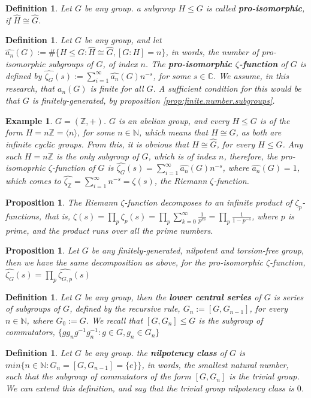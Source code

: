 \documentclass[12pt]{article}
\newtheorem{proposition}[theorem]{Proposition}
\newtheorem{definition}[theorem]{Definition}
\newtheorem{example}[theorem]{Example}
\begin{document}
\begin{definition}
\label{def:pro.isomorphic}
Let $G$ be any group. a subgroup $H\leq G$ is called \textbf{pro-isomorphic}, if $\widehat{H}\cong\widehat{G}$.
\end{definition}
\begin{definition}
\label{def:zeta.pro.isomorphic}
Let $G$ be any group, and let $\widehat{a_n}(G):=\#\{H\leq G : \widehat{H}\cong\widehat{G}, [G:H]=n\}$, in words, the number of pro-isomorphic subgroups of $G$, of index $n$. The \textbf{pro-isomorphic $\zeta$-function} of $G$ is defined by $\widehat{\zeta_G}(s):=\sum_{i=1}^{\infty}\widehat{a_n}(G)n^{-s}$, for some $s\in\mathbb{C}$. We assume, in this research, that $\widehat{a_n}(G)$ is finite for all $G$. A sufficient condition for this would be that $G$ is finitely-generated, by proposition \ref{prop:finite.number.subgroups}.
\end{definition}
\begin{example}
$G=(\mathbb{Z},+)$. $G$ is an abelian group, and every $H\leq G$ is of the form $H=n\mathbb{Z}=\langle n\rangle$, for some $n\in\mathbb{N}$, which means that $H\cong G$, as both are infinite cyclic groups. From this, it is obvious that $\widehat{H}\cong\widehat{G}$, for every $H\leq G$. Any such $H=n\mathbb{Z}$ is the only subgroup of $G$, which is of index $n$, therefore, the pro-isomoprhic $\zeta$-function of $G$ is $\widehat{\zeta_G}(s)=\sum_{i=1}^{\infty}\widehat{a_n}(G)n^{-s}$, where $\widehat{a_n}(G)=1$, which comes to $\widehat{\zeta_{\mathbb{Z}}}=\sum_{i=1}^{\infty}n^{-s}=\zeta(s)$, the Riemann $\zeta$-function. 
\end{example}
\begin{proposition}
\label{prop:zeta.decomposition}
The Riemann $\zeta$-function decomposes to an infinite product of $\zeta_p$-functions, that is, $\zeta(s)=\prod_p\zeta_p(s)=\prod_p\sum_{k=0}^\infty\frac{1}{p^{ks}}=\prod_p\frac{1}{1-p^{-s}}$, where $p$ is prime, and the product runs over all the prime numbers.
\end{proposition}
\begin{proposition}
\label{prop.proisomorphic.decomposition}
Let $G$ be any finitely-generated, nilpotent and torsion-free group, then we have the same decomposition as above, for the pro-isomorphic $\zeta$-function, $\widehat{\zeta_G}(s)=\prod_p\widehat{\zeta_{G,p}}(s)$
\end{proposition}
\begin{definition}
\label{def.lower.central.series}
Let $G$ be any group, then the \textbf{lower central series} of $G$ is series of subgroups of $G$, defined by the recursive rule, $G_n:=[G,G_{n-1}]$, for every $n\in\mathbb{N}$, where $G_0:=G$.  We recall that $[G,G_n]\leq G$ is the subgroup of commutators, $\{gg_ng^{-1}g_n^{-1} : g\in G,g_n\in G_n\}$
\end{definition}
\begin{definition}
\label{def.nilpotency.class}
Let $G$ be any group. the \textbf{nilpotency class} of $G$ is $min\{n\in\mathbb{N} : G_n=[G,G_{n-1}]=\{e\}\}$, in words, the smallest natural number, such that the subgroup of commutators of the form $[G,G_n]$ is the trivial group. We can extend this definition, and say that the trivial group nilpotency class is $0$.
\end{definition}
\end{document}
